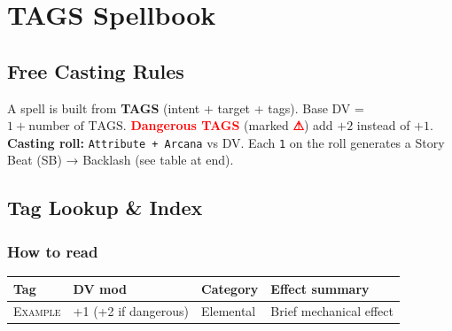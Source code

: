 \documentclass[10pt,a5paper]{book}
\newcommand{\dangerous}[1]{\textcolor{red}{\textbf{#1}}}
\newcommand{\tag}[1]{\textsc{#1}}
\begin{document}
\chapter*{TAGS Spellbook}
\tableofcontents

\section{Free Casting Rules}
A spell is built from \textbf{TAGS} (intent + target + tags).  
Base DV = \(1 + \text{number of TAGS}\).  
\dangerous{Dangerous TAGS} (marked \dangerous{⚠}) add \(+2\) instead of \(+1\). \\
\noindent\textbf{Casting roll:} \texttt{Attribute + Arcana} vs DV.  
Each \texttt{1} on the roll generates a Story Beat (SB) → Backlash (see table at end).

\newpage
\section{Tag Lookup \& Index}

\subsection*{How to read}
\begin{tabular}{@{} p{2.5cm} p{1cm} p{2.5cm} p{6cm} @{}}
\textbf{Tag} & \textbf{DV mod} & \textbf{Category} & \textbf{Effect summary} \\
\hline
\tag{Example} & +1 (+2 if dangerous) & Elemental & Brief mechanical effect \\
\end{tabular}
\vspace{0.5cm}
\end{document}
